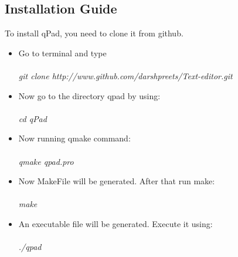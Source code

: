 \subsection{Installation Guide}
To install qPad, you need to clone it from github.
\begin{itemize}
\item Go to terminal and type\\\\
\textit{git clone http://www.github.com/darshpreets/Text-editor.git}
\item Now go to the directory qpad by using: \\\\
\textit{cd qPad}
\item Now running qmake command: \\\\
\textit{qmake qpad.pro}
\item Now MakeFile will be generated. After that run make: \\\\
\textit{make}
\item An executable file will be generated. Execute it using: \\\\
\textit{./qpad}
\end{itemize}